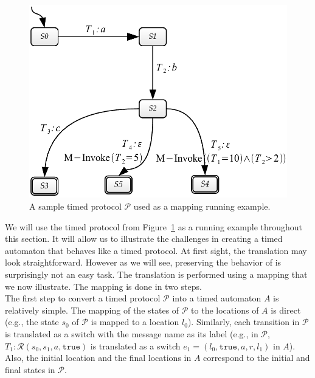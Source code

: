 \begin{figure}[htbp]
    \centering
    \includegraphics[width=\textwidth]{content/protocol-model/pta-protocol}
    \caption{A sample timed protocol $\mathcal{P}$ used as a mapping running example.}
    \label{fig:pta-protocol}
\end{figure}

We will use the timed protocol from Figure~\ref{fig:pta-protocol} as a running example throughout this section. It will allow us to illustrate the challenges in creating a timed automaton that behaves like a timed protocol. At first sight, the translation may look straightforward. However as we will see, preserving the behavior of \MInvoke is surprisingly not an easy task. The translation is performed using a mapping that we now illustrate. The mapping is done in two steps.\\

The first step to convert a timed protocol $\mathcal{P}$ into a timed automaton $A$ is relatively simple. The mapping of the states of $\mathcal{P}$ to the locations of $A$ is direct (e.g., the state $s_0$ of $\mathcal{P}$ is mapped to a location $l_0$). Similarly, each transition in $\mathcal{P}$ is translated as a switch with the message name as its label (e.g., in $\mathcal{P}$, $T_1: \mathcal{R}(s_0, s_1, a, \mathtt{true})$ is translated as a switch $e_1 = (l_0, \mathtt{true}, a, r, l_1)$ in $A$). Also, the initial location and the final locations in $A$ correspond to the initial and final states in $\mathcal{P}$.\\

